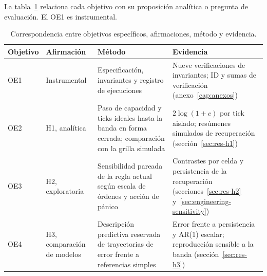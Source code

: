 La tabla~\ref{tab:oe-h} relaciona cada objetivo con su proposición analítica o pregunta de evaluación. El OE1 es instrumental.

\begin{table}[H]
\centering
\caption{Correspondencia entre objetivos específicos, afirmaciones, método y evidencia.}
\label{tab:oe-h}
\footnotesize
\setlength{\tabcolsep}{3pt}
\renewcommand{\arraystretch}{1.0}
\begin{tabularx}{\textwidth}{@{}l l >{\raggedright\arraybackslash}X >{\raggedright\arraybackslash}X@{}}
\toprule
Objetivo & Afirmación & Método & Evidencia \\
\midrule
OE1 & Instrumental & Especificación, invariantes y registro de ejecuciones & Nueve verificaciones de invariantes; ID y sumas de verificación (anexo~\ref{cap:anexos}) \\
OE2 & H1, analítica & Paso de capacidad y ticks ideales hasta la banda en forma cerrada; comparación con la grilla simulada & $2\log(1+c)$ por tick aislado; resúmenes simulados de recuperación (sección~\ref{sec:res-h1}) \\
OE3 & H2, exploratoria & Sensibilidad pareada de la regla actual según escala de órdenes y acción de pánico & Contrastes por celda y persistencia de la recuperación (secciones~\ref{sec:res-h2} y~\ref{sec:engineering-sensitivity}) \\
OE4 & H3, comparación de modelos & Descripción predictiva reservada de trayectorias de error frente a referencias simples & Error frente a persistencia y AR(1) escalar; reproducción sensible a la banda (sección~\ref{sec:res-h3}) \\
\bottomrule
\end{tabularx}
\end{table}
